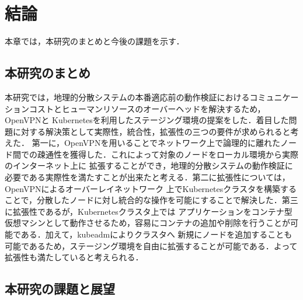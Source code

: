 \chapter{結論}
\label{conclusion}

本章では，本研究のまとめと今後の課題を示す．

\section{本研究のまとめ}
\label{conclusion:conclusion}
本研究では，地理的分散システムの本番適応前の動作検証におけるコミュニケーションコストとヒューマンリソースのオーバーヘッドを解決するため，OpenVPNと
Kubernetesを利用したステージング環境の提案をした．着目した問題に対する解決策として実際性，統合性，拡張性の三つの要件が求められると考えた．
第一に，OpenVPNを用いることでネットワーク上で論理的に離れたノード間での疎通性を獲得した．これによって対象のノードをローカル環境から実際のインターネット上に
拡張することができ，地理的分散システムの動作検証に必要である実際性を満たすことが出来たと考える．第二に拡張性については，OpenVPNによるオーバーレイネットワーク
上でKubernetesクラスタを構築することで，分散したノードに対し統合的な操作を可能にすることで解決した．第三に拡張性であるが，Kubernetesクラスタ上では
アプリケーションをコンテナ型仮想マシンとして動作させるため，容易にコンテナの追加や削除を行うことが可能である．加えて，kubeadmによりクラスタへ
新規にノードを追加することも可能であるため，ステージング環境を自由に拡張することが可能である．よって拡張性も満たしていると考えられる．

\section{本研究の課題と展望}
\label{conclusion:issue}

